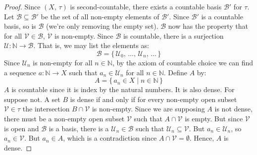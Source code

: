 \documentclass{article}
\theoremstyle{plain}
\theoremstyle{normal}
\begin{document}
        \begin{proof}
            Since $(X,\,\tau)$ is second-countable, there exists a countable
            basis $\mathcal{B}'$ for $\tau$. Let
            $\mathcal{B}\subseteq\mathcal{B}'$ be the set
            of all non-empty elements of $\mathcal{B}'$. Since
            $\mathcal{B}'$ is a countable basis, so is $\mathcal{B}$
            (we're only removing the empty set). $\mathcal{B}$ now has the
            property that for all $\mathcal{V}\in\mathcal{B}$,
            $\mathcal{V}$ is non-empty. Since $\mathcal{B}$ is countable, there
            is a surjection $\mathcal{U}:\mathbb{N}\rightarrow\mathcal{B}$. That
            is, we may list the elements as:
            \begin{equation}
                \mathcal{B}=
                \{\,\mathcal{U}_{0},\,\dots,\,\mathcal{U}_{n},\,\dots\,\}
            \end{equation}
            Since $\mathcal{U}_{n}$ is non-empty for all $n\in\mathbb{N}$, by
            the axiom of countable choice we can find a sequence
            $a:\mathbb{N}\rightarrow{X}$ such that $a_{n}\in\mathcal{U}_{n}$
            for all $n\in\mathbb{N}$. Define $A$ by:
            \begin{equation}
                A=\{\,a_{n}\in{X}\;|\;n\in\mathbb{N}\,\}
            \end{equation}
            $A$ is countable since
            it is index by the natural numbers. It is also dense. For suppose
            not. A set $B$ is dense if and only if for every non-empty open
            subset $\mathcal{V}\in\tau$ the intersection $B\cap\mathcal{V}$ is
            non-empty. Since we are supposing $A$ is not dense, there must be a
            non-empty open subset $\mathcal{V}$ such that
            $A\cap\mathcal{V}$ is empty. But since $\mathcal{V}$ is open and
            $\mathcal{B}$ is a basis, there is a $\mathcal{U}_{n}\in\mathcal{B}$
            such that $\mathcal{U}_{n}\subseteq\mathcal{V}$. But
            $a_{n}\in\mathcal{U}_{n}$, so $a_{n}\in\mathcal{V}$. But
            $a_{n}\in{A}$, which is a contradiction since
            $A\cap\mathcal{V}=\emptyset$. Hence, $A$ is dense.
        \end{proof}
\end{document}
